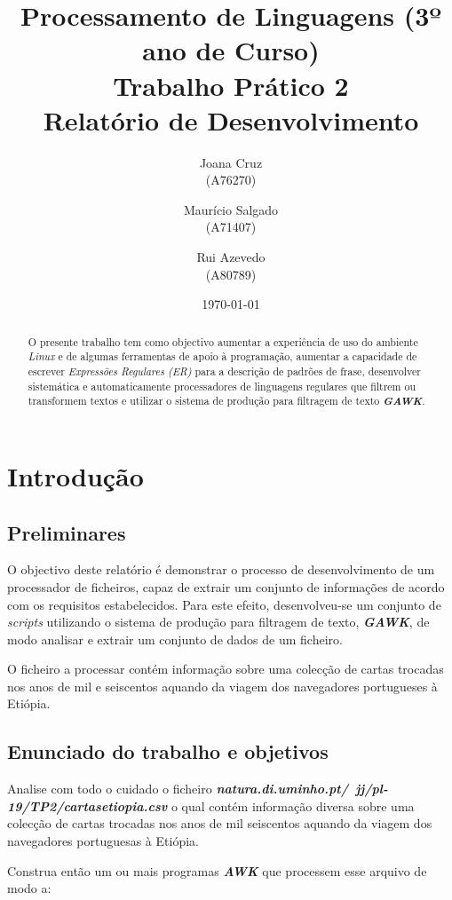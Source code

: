 \documentclass[11pt,a4paper]{report}
\title{Processamento de Linguagens (3º ano de Curso)\\
       \textbf{Trabalho Prático 2}\\ Relatório de Desenvolvimento
       } %
\author{Joana Cruz\\ (A76270) \and Maurício Salgado\\ (A71407)
         \and Rui Azevedo\\ (A80789)
       } %
\date{\today}
\begin{document}
\maketitle

\newpage

\begin{abstract}
    \qquad O presente trabalho tem como objectivo aumentar a experiência de uso do ambiente \textit{Linux} e de algumas ferramentas de apoio à programação, aumentar a capacidade de escrever \textit{Expressões Regulares (ER)} para a descrição de padrões de frase, desenvolver sistemática e automaticamente processadores de linguagens regulares que filtrem  ou transformem textos e utilizar o sistema de produção para filtragem de texto \textbf{\textit{GAWK}}.
\end{abstract}

\tableofcontents

\chapter{Introdução}

\section{Preliminares}
    \qquad O objectivo deste relatório é demonstrar o processo de desenvolvimento de um processador de ficheiros, capaz de extrair um conjunto de informações de acordo com os requisitos estabelecidos. Para este efeito, desenvolveu-se um conjunto de \textit{scripts} utilizando o sistema de produção para filtragem de texto, \textbf{\textit{GAWK}}, de modo analisar e extrair um conjunto de dados de um ficheiro.
    
    \quad O ficheiro a processar contém informação sobre uma colecção de cartas trocadas nos anos de mil e seiscentos aquando da viagem dos navegadores portugueses à Etiópia.
    
\section{Enunciado do trabalho e objetivos}
    \qquad Analise com todo o cuidado o ficheiro \textbf{\textit{natura.di.uminho.pt/~jj/pl-19/TP2/cartasetiopia.csv}} o qual contém informação diversa sobre uma colecção de cartas trocadas nos anos de mil seiscentos aquando da viagem dos navegadores portuguesas à Etiópia.

    \qquad Construa então um ou mais programas \textit{\textbf{AWK}} que processem esse arquivo de modo a:
    
\end{document}
